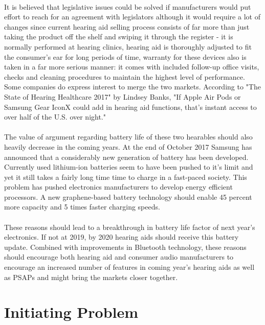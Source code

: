 \paragraph{}
It is believed that legislative issues could be solved if manufacturers would put effort to reach for an agreement with legislators although it would require a lot of changes since current hearing aid selling process consists of far more than just taking the product off the shelf and swiping it through the register - it is normally performed at hearing clinics, hearing aid is thoroughly adjusted to fit the consumer's ear for long periods of time, warranty for these devices also is taken in a far more serious manner: it comes with included follow-up office visits, checks and cleaning procedures to maintain the highest level of performance. Some companies do express interest to merge the two markets. According to "The State of Hearing Healthcare 2017" by Lindsey Banks, "If Apple Air Pods or Samsung Gear IconX could add in hearing aid functions, that’s instant access to over half of the U.S. over night."  
\paragraph{}
The value of argument regarding battery life of these two hearables should also heavily decrease in the coming years. At the end of October 2017 Samsung has announced that a considerably new generation of battery has been developed. Currently used lithium-ion batteries seem to have been pushed to it's limit  and yet it still takes a fairly long time time to charge in a fast-paced society. This problem has pushed electronics manufacturers to develop energy efficient processors. A new graphene-based battery technology should enable 45 percent more capacity and 5 times faster charging speeds.
\paragraph{}
These reasons should lead to a breakthrough in battery life factor of next year's electronics. If not at 2019, by 2020 hearing aids should receive this battery update. Combined with improvements in Bluetooth technology, these reasons should encourage both hearing aid and consumer audio manufacturers to encourage an increased number of features in coming year's hearing aids as well as PSAPs and might bring the markets closer together. 
   

\section{Initiating Problem}


